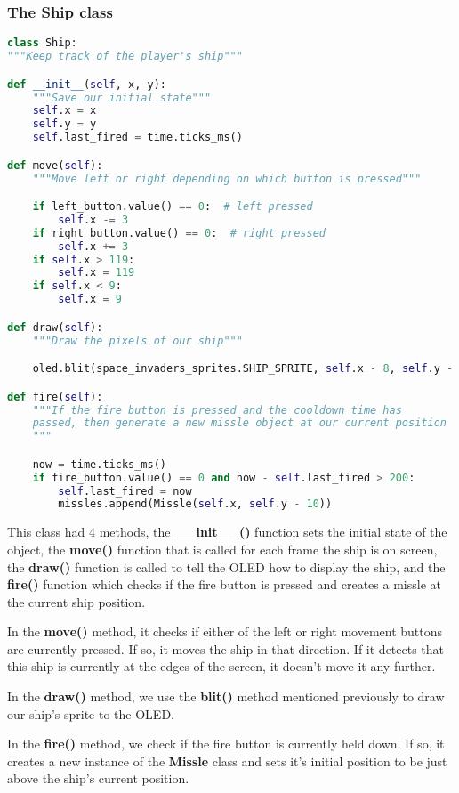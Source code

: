 \subsubsection{The Ship class}
\begin{lstlisting}[language=Python,caption=The Ship class]
class Ship:
"""Keep track of the player's ship"""

def __init__(self, x, y):
    """Save our initial state"""
    self.x = x
    self.y = y
    self.last_fired = time.ticks_ms()

def move(self):
    """Move left or right depending on which button is pressed"""

    if left_button.value() == 0:  # left pressed
        self.x -= 3
    if right_button.value() == 0:  # right pressed
        self.x += 3
    if self.x > 119:
        self.x = 119
    if self.x < 9:
        self.x = 9

def draw(self):
    """Draw the pixels of our ship"""

    oled.blit(space_invaders_sprites.SHIP_SPRITE, self.x - 8, self.y - 5)

def fire(self):
    """If the fire button is pressed and the cooldown time has
    passed, then generate a new missle object at our current position
    """

    now = time.ticks_ms()
    if fire_button.value() == 0 and now - self.last_fired > 200:
        self.last_fired = now
        missles.append(Missle(self.x, self.y - 10))
\end{lstlisting}

This class had 4 methods, the \textbf{\_\_init\_\_()} function sets the initial state of the object,
the \textbf{move()} function that is called for each frame the ship is on screen, the \textbf{draw()}
function is called to tell the OLED how to display the ship, and the \textbf{fire()} function which
checks if the fire button is pressed and creates a missle at the current ship position.

In the \textbf{move()} method, it checks if either of the left or right movement buttons are currently
pressed. If so, it moves the ship in that direction. If it detects that this ship is currently at the
edges of the screen, it doesn't move it any further.

In the \textbf{draw()} method, we use the \textbf{blit()} method mentioned previously to draw our ship's sprite to the OLED.

In the \textbf{fire()} method, we check if the fire button is currently held down. If so, it creates a new
instance of the \textbf{Missle} class and sets it's initial position to be just above the ship's current position.

